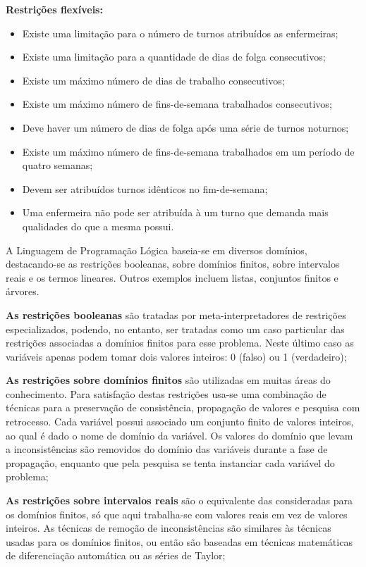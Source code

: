 \textbf{Restrições flexíveis:}
\begin{itemize}
\item Existe uma limitação para o número de turnos atribuídos as enfermeiras; 
\item Existe uma limitação para a quantidade de dias de folga consecutivos; 
\item Existe um máximo número de dias de trabalho consecutivos;
\item Existe um máximo número de fins-de-semana trabalhados consecutivos;
\item Deve haver um número de dias de folga após uma série de turnos noturnos;
\item Existe um máximo número de fins-de-semana trabalhados em um período de quatro semanas; 
\item Devem ser atribuídos turnos idênticos no fim-de-semana;
\item Uma enfermeira não pode ser atribuída à um turno que demanda mais qualidades do que a mesma possui.
\end{itemize}

A Linguagem de Programação Lógica baseia-se em diversos domínios, destacando-se as restrições booleanas, sobre domínios finitos, sobre intervalos reais e os termos lineares. Outros exemplos incluem listas, conjuntos finitos e árvores.

\textbf{As restrições booleanas} são tratadas por meta-interpretadores de restrições
especializados, podendo, no entanto, ser tratadas como um caso particular das
restrições associadas a domínios finitos para esse problema. Neste último caso
as variáveis apenas podem tomar dois valores inteiros: 0 (falso) ou 1
(verdadeiro);

\textbf{As restrições sobre domínios finitos} são utilizadas em muitas áreas do
conhecimento. Para satisfação destas restrições usa-se uma combinação de
técnicas para a preservação de consistência, propagação de valores e pesquisa
com retrocesso. Cada variável possui associado um conjunto finito de valores
inteiros, ao qual é dado o nome de domínio da variável. Os valores do domínio
que levam a inconsistências são removidos do domínio das variáveis durante a
fase de propagação, enquanto que pela pesquisa se tenta instanciar cada
variável do problema;

\textbf{As restrições sobre intervalos reais} são o equivalente das consideradas para os domínios finitos, só que aqui trabalha-se com valores reais em vez de
valores inteiros. As técnicas de remoção de inconsistências são similares às
técnicas usadas para os domínios finitos, ou então são baseadas em técnicas
matemáticas de diferenciação automática ou as séries de Taylor;

